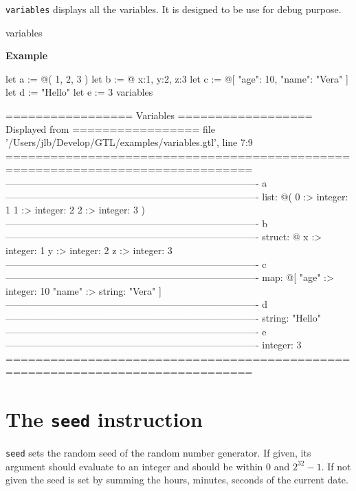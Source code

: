 \documentclass[10pt,openright,twosides,final]{memoir}
\newcommand{\gtlinline}[1]{\colorbox{light-blue}{\lstinline[language=gtl]{#1}}}
\newcommand{\example}{\vspace{.75em}\noindent\textbf{Example}\vspace{0em}}
\begin{document}
\gtlinline{variables} displays all the variables. It is designed to be use for debug purpose.

\begin{gtl}
variables
\end{gtl}

\example
\begin{gtl}
let a := @( 1, 2, 3 )
let b := @{ x:1, y:2, z:3 }
let c := @[ "age": 10, "name": "Vera" ]
let d := "Hello"
let e := 3
variables
\end{gtl}
\begin{console}
================= Variables ================== Displayed from =================
file '/Users/jlb/Develop/GTL/examples/variables.gtl', line 7:9
===============================================================================
-------------------------------------------------------------------------------
a
-------------------------------------------------------------------------------
list: @(
    0 :>
        integer: 1
    1 :>
        integer: 2
    2 :>
        integer: 3
)
-------------------------------------------------------------------------------
b
-------------------------------------------------------------------------------
struct: @{
    x :>
        integer: 1
    y :>
        integer: 2
    z :>
        integer: 3
}
-------------------------------------------------------------------------------
c
-------------------------------------------------------------------------------
map: @[
    "age" :>
        integer: 10
    "name" :>
        string: "Vera"
]
-------------------------------------------------------------------------------
d
-------------------------------------------------------------------------------
string: "Hello"
-------------------------------------------------------------------------------
e
-------------------------------------------------------------------------------
integer: 3
===============================================================================
\end{console}

\section{The \texttt{seed} instruction}

\gtlinline{seed} sets the random seed of the random number generator. If given, its argument should evaluate to an integer and should be within $0$ and $2^{32}-1$. If not given the seed is set by summing the hours, minutes, seconds of the current date.
\end{document}

